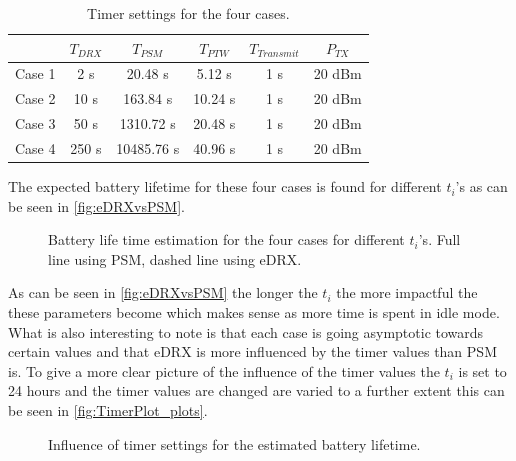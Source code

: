 \begin{table}[H]
\centering
\begin{tabular}{|c|c|c|c|c|c|} \hline
		& $T_{DRX}$	& $T_{PSM}$	& $T_{PTW}$	& $T_{Transmit}$	& $P_{TX}$ 	\\ \hline
Case 1	& 2 s 		& 20.48 s	& 5.12 s	& 1 s				& 20 dBm	\\ \hline
Case 2	& 10 s		& 163.84 s	& 10.24 s	& 1 s				& 20 dBm	\\ \hline
Case 3	& 50 s		& 1310.72 s	& 20.48 s	& 1 s				& 20 dBm	\\ \hline
Case 4	& 250 s		& 10485.76 s& 40.96 s	& 1 s				& 20 dBm	\\ \hline
\end{tabular}
\caption{Timer settings for the four cases.}
\label{tab:case_description}
\end{table}

The expected battery lifetime for these four cases is found for different $t_i$'s as can be seen in \autoref{fig:eDRXvsPSM}.

\begin{figure}[H]
\centering
{}
\resizebox{0.7\textwidth}{!}{
}
\caption{Battery life time estimation for the four cases for different $t_i$'s. Full line using PSM, dashed line using eDRX.}
\label{fig:eDRXvsPSM}
\end{figure}

As can be seen in \autoref{fig:eDRXvsPSM} the longer the $t_i$ the more impactful the these parameters become which makes sense as more time is spent in idle mode. What is also interesting to note is that each case is going asymptotic towards certain values and that eDRX is more influenced by the timer values than PSM is. To give a more clear picture of the influence of the timer values the $t_i$ is set to 24 hours and the timer values are changed are varied to a further extent this can be seen in \autoref{fig:TimerPlot_plots}.


\begin{figure}[H]
\centering
\begin{minipage}{0.48\textwidth}
\resizebox{\textwidth}{!}{
}
\end{minipage}
\hfill
\begin{minipage}{0.48\textwidth}
\resizebox{\textwidth}{!}{
}
\end{minipage}
\caption{Influence of timer settings for the estimated battery lifetime.}
\label{fig:TimerPlot_plots}
\end{figure}

